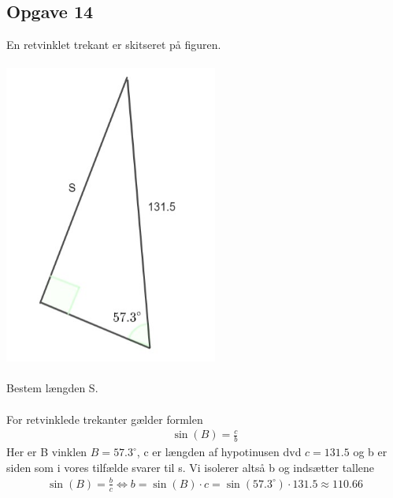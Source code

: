 \subsection{Opgave 14}

En retvinklet trekant er skitseret på figuren.\\\\
\includegraphics[width=7cm]{Opgave_11-20/Opgave_14/Opgave_14.jpg}\\\\
Bestem længden S.\\\\

\ans
For retvinklede trekanter gælder formlen
\begin{align*}
    \sin(B) = \frac{c}{b}
\end{align*}
Her er B vinklen $B = 57.3^{\circ}$, c er længden af hypotinusen dvd $c = 131.5$ og b er siden som i vores tilfælde svarer til s. Vi isolerer altså b og indsætter tallene
\begin{align*}
    \sin(B) = \frac{b}{c} \Longleftrightarrow b = \sin(B)\cdot c = \sin(57.3^{\circ})\cdot 131.5 \approx 110.66
\end{align*}
